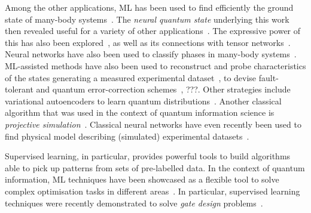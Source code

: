 Among the other applications, \ac{ML} has been used to find efficiently the ground state of many-body systems~\cite{carleo2017solving}. The \emph{neural quantum state} \ansatz underlying this work then revealed useful for a variety of other applications~\cite{torlai2017neural,torlai2017manybody,choo2018symmetries,saito2018method,torlai2018neuralnetwork,torlai2018latent,sharir2019deep,jia2019quantum,levine2019quantum,hartmann2019neuralnetwork,vicentini2019variational,torlai2019integrating,liu2019machine,harney2019entanglement,cui2019directions,carleo2019machine}. The expressive power of this \ansatz has also been explored~\cite{deng2017quantum,gao2017efficient}, as well as its connections with tensor networks~\cite{glasser2018neuralnetwork}.
Neural networks have also been used to classify phases in many-body systems~\cite{wang2016discovering,carrasquilla2017machine,van2017learning,deng2017machine,kaubruegger2018chiral,carleo2019machine}.
ML-assisted methods have also been used to reconstruct and probe characteristics of the states generating a measured experimental dataset~\cite{fujita2018construction,gray2018machinelearningassisted,havlíček2019supervised,canabarro2019machine,agresti2019pattern}, to devise fault-tolerant and quantum error-correction schemes~\cite{liu2019neural}, ???.
Other strategies include variational autoencoders to learn quantum distributions~\cite{rocchetto2018learning}.
Another classical algorithm that was used in the context of quantum information science is \emph{projective simulation}~\cite{melnikov2014projective,makmal2016metalearning,melnikov2017projective,melnikov2018benchmarking,melnikov2018active,wallnöfer2019machine,flamini2019photonic}.
Classical neural networks have even recently been used to find physical model describing (simulated) experimental datasets~\cite{iten2020discovering,nautrup2020operationally}.


Supervised learning, in particular, provides powerful tools to build algorithms able to pick up patterns from sets of pre-labelled data.
In the context of quantum information, \ac{ML} techniques have been showcased as a flexible tool to solve complex optimisation tasks in different areas~\cite{zdeborov2017machine,carrasquilla2017machine,carleo2017solving,van2017learning,schoenholz2016structural,torlai2017manybody,rocchetto2019experimental,melnikov2018active,banchi2016quantum,fujita2018construction,innocenti2018supervised}.
In particular, supervised learning techniques were recently demonstrated to solve \emph{gate design} problems~\cite{banchi2016quantum,innocenti2018supervised,innocenti2018approximate}.


